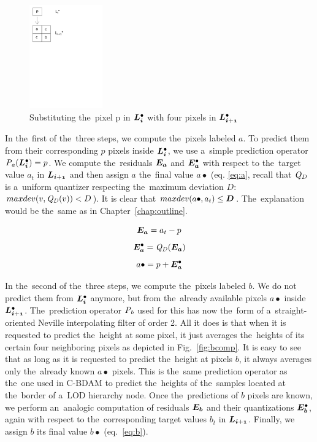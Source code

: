 \begin{figure}
	\includegraphics[trim={0 19cm 11cm 0}, clip, width=0.28\textwidth]{figures/subst.pdf}\centering
	\caption{Substituting the~pixel p in $\ldot{i}$ with four pixels in $\ldot{i+1}$}
	\label{fig:subst}
\end{figure}
In the~first of the~three steps, we compute the~pixels labeled $a$. To predict them from their corresponding $p$ pixels inside $\ldot{i}$, we use a~simple prediction operator $\opnorm{P}{a}(\ldot{i}) = p$. We compute the~residuals $\objnorm{E}{a}$ and $\objdot{E}{a}$ with respect to the~target value $a_t$ in $\lnorm{i+1}$ and then assign $a$ the~final value $a\bullet$ (eq. \ref{eq:a}, recall that $\mathit{Q_{D}}$ is a~uniform quantizer respecting the~maximum deviation $D$: $maxdev(v, \mathit{Q_{D}}(v)) < D$). It is clear that  $maxdev(a\bullet, a_{t}) \leq \objnorm{D}{}$. The~explanation would be the~same as in Chapter~\ref{chap:outline}.

$$\objnorm{E}{a} = a_t - p$$
$$\objdot{E}{a} = \opnorm{Q}{D}(\objnorm{E}{a})$$
\begin{equation}
\label{eq:a}
a\bullet = p + \objdot{E}{a}
\end{equation}

In the~second of the~three steps, we compute the~pixels labeled $b$. We do not predict them from $\ldot{i}$ anymore, but from the~already available pixels $a\bullet$ inside $\ldot{i+1}$. The~prediction operator $\mathit{P_{b}}$ used for this has now the~form of a~straight-oriented Neville interpolating filter of order 2. All it does is that when it is requested to predict the~height at some pixel, it just averages the~heights of its certain four neighboring pixels as depicted in Fig.~\ref{fig:bcomp}. It is easy to see that as long as it is requested to predict the~height at pixels $b$, it always averages only the~already known $a\bullet$ pixels. This is the~same prediction operator as the~one used in C-BDAM to predict the~heights of the~samples located at the~border of a~LOD hierarchy node. Once the~predictions of $b$ pixels are known, we perform an~analogic computation of residuals $\objnorm{E}{b}$ and their quantizations $\objdot{E}{b}$, again with respect to the~corresponding target values $b_t$ in $\lnorm{i+1}$. Finally, we assign $b$ its final value $b\bullet$ (eq.~\ref{eq:b}).

